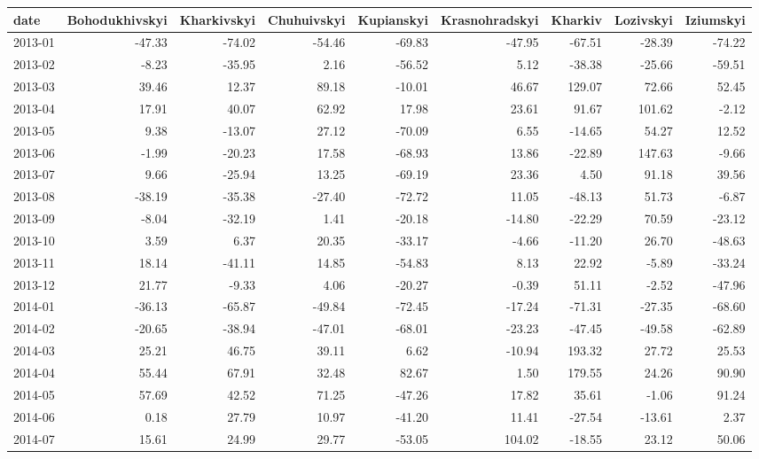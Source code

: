 \begin{table}[ht]
\centering
\begin{tabular}{lrrrrrrrr}
  \hline
date & Bohodukhivskyi & Kharkivskyi & Chuhuivskyi & Kupianskyi & Krasnohradskyi & Kharkiv & Lozivskyi & Iziumskyi \\ 
  \hline
2013-01 & -47.33 & -74.02 & -54.46 & -69.83 & -47.95 & -67.51 & -28.39 & -74.22 \\ 
  2013-02 & -8.23 & -35.95 & 2.16 & -56.52 & 5.12 & -38.38 & -25.66 & -59.51 \\ 
  2013-03 & 39.46 & 12.37 & 89.18 & -10.01 & 46.67 & 129.07 & 72.66 & 52.45 \\ 
  2013-04 & 17.91 & 40.07 & 62.92 & 17.98 & 23.61 & 91.67 & 101.62 & -2.12 \\ 
  2013-05 & 9.38 & -13.07 & 27.12 & -70.09 & 6.55 & -14.65 & 54.27 & 12.52 \\ 
  2013-06 & -1.99 & -20.23 & 17.58 & -68.93 & 13.86 & -22.89 & 147.63 & -9.66 \\ 
  2013-07 & 9.66 & -25.94 & 13.25 & -69.19 & 23.36 & 4.50 & 91.18 & 39.56 \\ 
  2013-08 & -38.19 & -35.38 & -27.40 & -72.72 & 11.05 & -48.13 & 51.73 & -6.87 \\ 
  2013-09 & -8.04 & -32.19 & 1.41 & -20.18 & -14.80 & -22.29 & 70.59 & -23.12 \\ 
  2013-10 & 3.59 & 6.37 & 20.35 & -33.17 & -4.66 & -11.20 & 26.70 & -48.63 \\ 
  2013-11 & 18.14 & -41.11 & 14.85 & -54.83 & 8.13 & 22.92 & -5.89 & -33.24 \\ 
  2013-12 & 21.77 & -9.33 & 4.06 & -20.27 & -0.39 & 51.11 & -2.52 & -47.96 \\ 
  2014-01 & -36.13 & -65.87 & -49.84 & -72.45 & -17.24 & -71.31 & -27.35 & -68.60 \\ 
  2014-02 & -20.65 & -38.94 & -47.01 & -68.01 & -23.23 & -47.45 & -49.58 & -62.89 \\ 
  2014-03 & 25.21 & 46.75 & 39.11 & 6.62 & -10.94 & 193.32 & 27.72 & 25.53 \\ 
  2014-04 & 55.44 & 67.91 & 32.48 & 82.67 & 1.50 & 179.55 & 24.26 & 90.90 \\ 
  2014-05 & 57.69 & 42.52 & 71.25 & -47.26 & 17.82 & 35.61 & -1.06 & 91.24 \\ 
  2014-06 & 0.18 & 27.79 & 10.97 & -41.20 & 11.41 & -27.54 & -13.61 & 2.37 \\ 
  2014-07 & 15.61 & 24.99 & 29.77 & -53.05 & 104.02 & -18.55 & 23.12 & 50.06 \\ 

\end{tabular}
\end{table}
